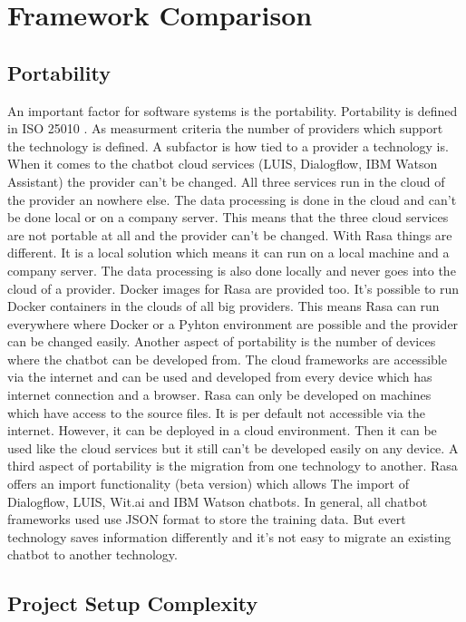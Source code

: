 
\section{Framework Comparison}

\subsection*{Portability}
An important factor for software systems is the portability.
Portability is defined in ISO 25010 \cite{iso25010}.
As measurment criteria the number of providers which support the technology is defined.
A subfactor is how tied to a provider a technology is.
When it comes to the chatbot cloud services (LUIS, Dialogflow, IBM Watson Assistant)
the provider can't be changed.
All three services run in the cloud of the provider an nowhere else.
The data processing is done in the cloud and can't be done local or on a company server.
This means that the three cloud services are not portable at all and 
the provider can't be changed.
With Rasa things are different.
It is a local solution which means it can run on a local machine and a company server.
The data processing is also done locally and never goes into the cloud of a provider.
Docker images for Rasa are provided too.
It's possible to run Docker containers in the clouds of all big providers.
This means Rasa can run everywhere where Docker or a Pyhton environment are possible 
and the provider can be changed easily.
Another aspect of portability is the number of devices where the chatbot can be developed
from.
The cloud frameworks are accessible via the internet and can be used 
and developed from every device which has internet connection and a
browser.
Rasa can only be developed on machines which have access to the 
source files.
It is per default not accessible via the internet.
However, it can be deployed in a cloud environment.
Then it can be used like the cloud services but it 
still can't be developed easily on any device.
A third aspect of portability is the migration from one technology to another.
Rasa offers an import functionality (beta version) which allows The
import of Dialogflow, LUIS, Wit.ai and IBM Watson chatbots.
In general, all chatbot frameworks used use JSON format to store
the training data.
But evert technology saves information differently and it's not 
easy to migrate an existing chatbot to another technology.

\subsection*{Project Setup Complexity}

